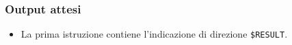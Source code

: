 \documentclass[../Sperimentazione.tex]{subfiles}
\begin{document}
	\subsubsection{Output attesi}
		\begin{itemize}
			\item La prima istruzione contiene l'indicazione di direzione  \verb|$RESULT|.
		\end{itemize}

	
	
		
	
\end{document}
